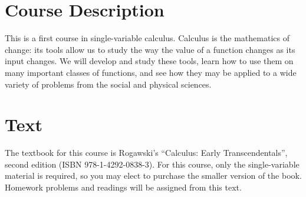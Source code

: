 \documentclass[11pt,article]{memoir}
\begin{document}
\maketitle

\section*{Course Description}
This is a first course in single-variable calculus.
Calculus is the mathematics of change: its tools allow us to study the way the value of a function changes as its input changes.
We will develop and study these tools, learn how to use them on many important classes of functions, and see how they may be applied to a wide variety of problems from the social and physical sciences.

\section*{Text}
The textbook for this course is Rogawski's ``Calculus: Early Transcendentals'', second edition
(ISBN 978-1-4292-0838-3).
For this course, only the single-variable material is required, so you may elect to purchase the smaller version of the book.
Homework problems and readings will be assigned from this text.
\end{document}

